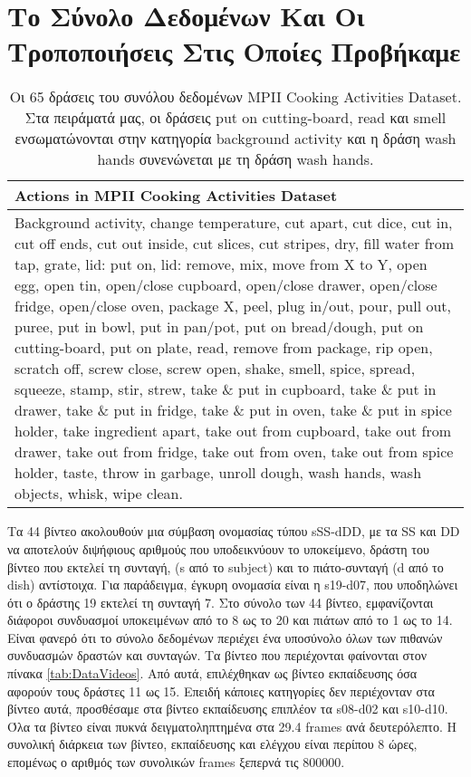 \chapter{Το Σύνολο Δεδομένων Και Οι Τροποποιήσεις Στις Οποίες Προβήκαμε} \label{dataset}




\begin{table}
	\begin{tabular}{|p{13.5cm}|}
		\hline
		Actions in MPII Cooking Activities Dataset \\ \hline
		Background activity, change temperature, cut apart, cut dice, cut in, cut off ends, cut out inside, cut slices, cut stripes, dry, fill water from tap, grate, lid: put on, lid: remove, mix, move from X to Y, open egg, open tin, open/close cupboard, open/close drawer, open/close fridge, open/close oven, package X, peel, plug in/out, pour, pull out, puree, put in bowl, put in pan/pot, put on bread/dough, put on cutting-board, put on plate, read, remove from package, rip open, scratch off, screw close, screw open, shake, smell, spice, spread, squeeze, stamp, stir, strew, take \& put in cupboard, take \& put in drawer, take \& put in fridge, take \& put in oven, take \& put in spice holder, take ingredient apart, take out from cupboard, take out from drawer, take out from fridge, take out from oven, take out from spice holder, taste, throw in garbage, unroll dough, wash hands, wash objects, whisk, wipe clean. \\
		\hline
	\end{tabular}
	\caption{Οι 65 δράσεις του συνόλου δεδομένων MPII Cooking Activities Dataset. Στα πειράματά μας, οι δράσεις put on cutting-board, read και smell ενσωματώνονται στην κατηγορία background activity και η δράση wash hands συνενώνεται με τη δράση wash hands.}
	\label{tab:DataActions}
\end{table}



\par Τα 44 βίντεο ακολουθούν μια σύμβαση ονομασίας τύπου sSS-dDD, με τα SS και DD να αποτελούν διψήφιους αριθμούς που υποδεικνύουν το υποκείμενο, δράστη του βίντεο που εκτελεί τη συνταγή, (s από το subject) και το πιάτο-συνταγή (d από το dish) αντίστοιχα. Για παράδειγμα, έγκυρη ονομασία είναι η s19-d07, που υποδηλώνει ότι ο δράστης 19 εκτελεί τη συνταγή 7. Στο σύνολο των 44 βίντεο, εμφανίζονται διάφοροι συνδυασμοί υποκειμένων από το 8 ως το 20 και πιάτων από το 1 ως το 14. Είναι φανερό ότι το σύνολο δεδομένων περιέχει ένα υποσύνολο όλων των πιθανών συνδυασμών δραστών και συνταγών. Τα βίντεο που περιέχονται φαίνονται στον πίνακα \ref{tab:DataVideos}. Από αυτά, επιλέχθηκαν ως βίντεο εκπαίδευσης όσα αφορούν τους δράστες 11 ως 15. Επειδή κάποιες κατηγορίες δεν περιέχονταν στα βίντεο αυτά, προσθέσαμε στα βίντεο εκπαίδευσης επιπλέον τα s08-d02 και s10-d10. Όλα τα βίντεο είναι πυκνά δειγματοληπτημένα στα 29.4 frames ανά δευτερόλεπτο. Η συνολική διάρκεια των βίντεο, εκπαίδευσης και ελέγχου είναι περίπου 8 ώρες, επομένως ο αριθμός των συνολικών frames ξεπερνά τις 800000.

